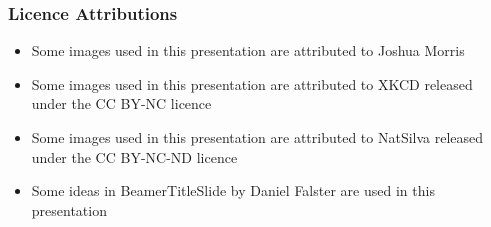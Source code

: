 \begin{frame}
\frametitle{Licence Attributions}
\begin{itemize}
\item Some images used in this presentation are attributed to Joshua Morris
\item Some images used in this presentation are attributed to XKCD released under the CC BY-NC licence
\item Some images used in this presentation are attributed to NatSilva released under the CC BY-NC-ND licence
\item Some ideas in BeamerTitleSlide by Daniel Falster are used in this presentation
\end{itemize}
\end{frame}
